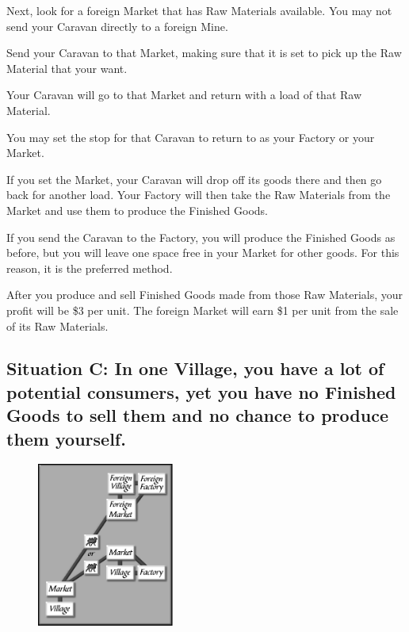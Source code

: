 Next, look for a foreign Market that has Raw Materials available. You may not send your Caravan directly to a foreign Mine.

Send your Caravan to that Market, making sure that it is set to pick up the Raw Material that your want.

Your Caravan will go to that Market and return with a load of that Raw Material.

You may set the stop for that Caravan to return to as your Factory or your Market.


If you set the Market, your Caravan will drop off its goods there and then go back for another load. Your Factory will then take the Raw Materials from the Market and use them to produce the Finished Goods.

If you send the Caravan to the Factory, you will produce the Finished Goods as before, but you will leave one space free in your Market for other goods. For this reason, it is the preferred method.

After you produce and sell Finished Goods made from those Raw Materials, your profit will be \$3 per unit. The foreign Market will earn \$1 per unit from the sale of its Raw Materials.

\clearpage

\subsection{Situation C: In one Village, you have a lot of potential consumers, yet you have no Finished Goods to sell them and no chance to produce them yourself.}

\begin{figure}
	\vspace{-20pt}
	\begin{center}
		\includegraphics[width=0.4\textwidth]{Itradesit3}
	\end{center}
	\vspace{-20pt}
\end{figure}


